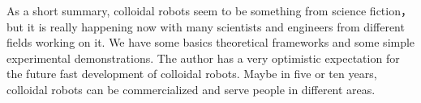 As a short summary, colloidal robots seem to be something from science fiction， but it is really happening now with many scientists and engineers from different fields working on it. We have some basics theoretical frameworks and some simple experimental demonstrations. The author has a very optimistic expectation for the future fast development of colloidal robots. Maybe in five or ten years, colloidal robots can be commercialized and serve people in different areas.  


